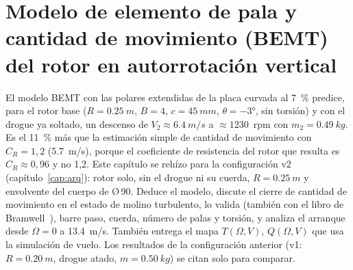 \chapter[Modelo BEMT del rotor en autorrotación]{Modelo de elemento de pala y cantidad de movimiento (BEMT) del rotor en autorrotación vertical}\label{cap:bemt}

El modelo BEMT con las polares extendidas de la placa curvada al \SI{7}{\percent}
predice, para el rotor base ($R=\SI{0.25}{m}$, $B=4$, $c=\SI{45}{mm}$, $\theta=\ang{-3}$,
sin torsión) y con el drogue ya soltado, un descenso de $V_2\approx\SI{6.4}{m/s}$ a
$\approx\num{1230}$~rpm con $m_2=\SI{0.49}{kg}$. Es el \SI{11}{\percent} más que la estimación
simple de cantidad de movimiento con $C_R=1{,}2$ (\SI{5.7}{m/s}), porque el
coeficiente de resistencia del rotor que resulta es $C_R\approx0{,}96$ y no 1,2. Este capítulo
se rehízo para la configuración v2 (capítulo~\ref{cap:arq}): rotor solo, sin el drogue ni su
cuerda, $R=\SI{0.25}{m}$ y envolvente del cuerpo de Ø\,90. Deduce el modelo, discute el cierre de cantidad de
movimiento en el estado de molino turbulento, lo valida (también con el libro de
Bramwell~\cite{bramwell2001}), barre paso, cuerda, número de palas y torsión, y analiza el
arranque desde $\Omega=0$ a \SI{13.4}{m/s}. También entrega el mapa $T(\Omega,V)$,
$Q(\Omega,V)$ que usa la simulación de vuelo. Los resultados de la configuración anterior (v1:
$R=\SI{0.20}{m}$, drogue atado, $m=\SI{0.50}{kg}$) se citan solo para comparar.

